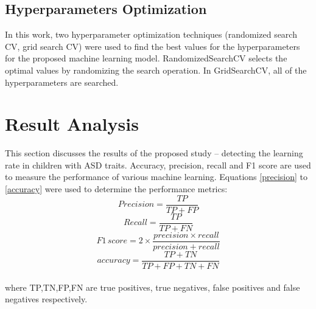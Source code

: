 \documentclass{article}
\begin{document}
\begin{multicols}{2}
\subsection{Hyperparameters Optimization}
\hspace*{\parindent}In this work, two hyperparameter optimization techniques (randomized search CV, grid search CV) were used to find the best values for the hyperparameters for the proposed machine learning model. RandomizedSearchCV selects the optimal values by randomizing the search operation. In GridSearchCV, all of the hyperparameters are searched.















\section{Result Analysis}
\hspace*{\parindent}This section discusses the results of the proposed study – detecting the learning rate in children with ASD traits. Accuracy, precision, recall and F1 score are used to measure the performance of various machine learning. Equations \ref{precision} to \ref{accuracy}  were used to determine the performance metrics:
\begin{equation}
    Precision = \frac{TP}{TP+FP}
    \label{precision}
\end{equation}
\begin{equation}
    Recall = \frac{TP}{TP+FN}
    \label{recall}
\end{equation}
\begin{equation}
    F1\,score = 2 \times \frac{precision \times recall}{precision + recall}
    \label{f1}
\end{equation}
\begin{equation}
   accuracy = \frac{TP+TN}{TP+FP+TN+FN}
    \label{accuracy}
\end{equation}\\
where TP,TN,FP,FN are true positives, true negatives, false
positives and false negatives respectively.


\end{multicols}
\end{document}

